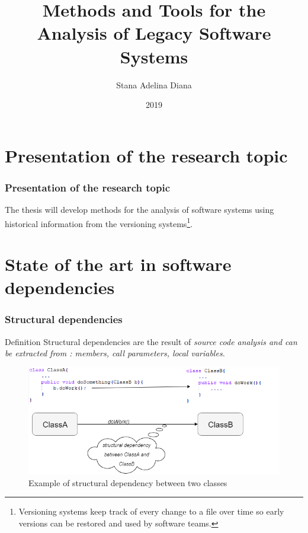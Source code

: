 \documentclass{beamer}
\title[Pres]{Methods and Tools for the Analysis of Legacy Software Systems}
\author{Stana Adelina Diana}
\institute{Computer Science and Engineering Department\\
"Politehnica" University of Timisoara}
\date{2019}
\begin{document}
\begin{frame}
  \titlepage
\end{frame}

\section{Presentation of the research topic}
 \begin{frame}
\frametitle{Presentation of the research topic}
 The thesis will develop methods for the analysis of software systems
 using historical information from the versioning systems\footnote{Versioning systems keep track of every change to a file over time so early versions can be restored and used by software teams.}. 
\end{frame}

\section{State of the art in software dependencies}
 \begin{frame}
\frametitle{Structural dependencies}
\begin{block}{Definition}
Structural dependencies are the result of \it{source code analysis} and can be extracted from : members, call parameters, local variables. 
\end{block}

\begin{center}
     \begin{figure}
	\includegraphics[width=\textwidth]{structural_dep.png}
	\caption{\label{fig:fig}Example of structural dependency between two classes}
     \end{figure}
\end{center}

\end{frame}

\end{document}
